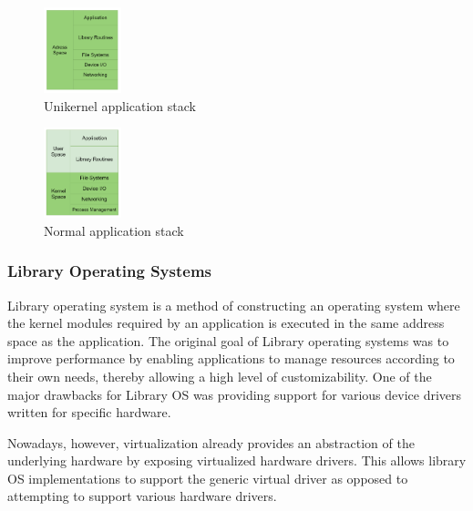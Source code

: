 \begin{figure}[htbp!] 
  \centering    
  \includegraphics[width=0.2\textwidth]{unikernel_application_stack}
  \caption[Unikernel]{Unikernel application stack \cite{UnikernelSurvey}}
  \label{fig:unikernel_application_stack}
  \end{figure}

  \begin{figure}[htbp!] 
    \centering    
    \includegraphics[width=0.2\textwidth]{normal_application_stack}
    \caption[Normal]{Normal application stack \cite{UnikernelSurvey}}
    \label{fig:normal_application_stack}
    \end{figure}

\subsubsection{Library Operating Systems}
Library\cite{LibraryOS} operating system is a method of constructing an operating system where the kernel modules  
required by an application is executed in the same address space as the application. The original goal 
of Library operating systems was to improve performance by enabling applications to manage resources according to 
their own needs, thereby allowing a high level of customizability. One of the major drawbacks for 
Library OS was providing support for various device drivers written for specific hardware. 

Nowadays, however, virtualization already provides an abstraction of the underlying hardware by exposing 
virtualized hardware drivers. This allows library OS implementations to support the generic virtual driver 
as opposed to attempting to support various hardware drivers.




